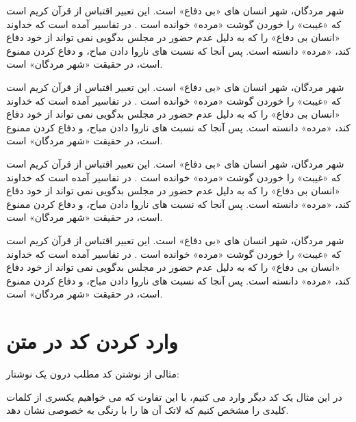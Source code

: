 \begin{lemma}
شهر مردگان، شهر انسان های «بی دفاع» است. این تعبیر اقتباس از قرآن کریم است که «غیبت» را خوردن گوشت «مرده» خوانده است . در تفاسیر آمده است که خداوند «انسان بی دفاع» را که به دلیل عدم حضور در مجلس بدگویی نمی تواند از خود دفاع کند، «مرده» دانسته است. پس آنجا که نسبت های ناروا دادن مباح، و دفاع کردن ممنوع است، در حقیقت «شهر مردگان» است.
\end{lemma}
\begin{lemmaproof}
شهر مردگان، شهر انسان های «بی دفاع» است. این تعبیر اقتباس از قرآن کریم است که «غیبت» را خوردن گوشت «مرده» خوانده است . در تفاسیر آمده است که خداوند «انسان بی دفاع» را که به دلیل عدم حضور در مجلس بدگویی نمی تواند از خود دفاع کند، «مرده» دانسته است. پس آنجا که نسبت های ناروا دادن مباح، و دفاع کردن ممنوع است، در حقیقت «شهر مردگان» است.
\end{lemmaproof}
\begin{ntremember}
شهر مردگان، شهر انسان های «بی دفاع» است. این تعبیر اقتباس از قرآن کریم است که «غیبت» را خوردن گوشت «مرده» خوانده است . در تفاسیر آمده است که خداوند «انسان بی دفاع» را که به دلیل عدم حضور در مجلس بدگویی نمی تواند از خود دفاع کند، «مرده» دانسته است. پس آنجا که نسبت های ناروا دادن مباح، و دفاع کردن ممنوع است، در حقیقت «شهر مردگان» است.
\end{ntremember}
\begin{ntproblems}
شهر مردگان، شهر انسان های «بی دفاع» است. این تعبیر اقتباس از قرآن کریم است که «غیبت» را خوردن گوشت «مرده» خوانده است . در تفاسیر آمده است که خداوند «انسان بی دفاع» را که به دلیل عدم حضور در مجلس بدگویی نمی تواند از خود دفاع کند، «مرده» دانسته است. پس آنجا که نسبت های ناروا دادن مباح، و دفاع کردن ممنوع است، در حقیقت «شهر مردگان» است.
\end{ntproblems}

\section{وارد کردن کد در متن}
\label{sec:codeintext}
مثالی از نوشتن کد مطلب درون یک نوشتار:

\begin{latin}

\end{latin}

در این مثال یک کد  دیگر وارد می کنیم، با این تفاوت که می خواهیم یکسری از کلمات کلیدی را مشخص کنیم که لاتک آن ها را با رنگی به خصوصی نشان دهد. 
\begin{latin}

\end{latin}

